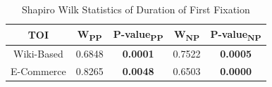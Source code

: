 \begin{table} [H]
    \centering
    \small
    \caption{Shapiro Wilk Statistics of Duration of First Fixation}
    \label{tab:dfff_W_stats}
    \begin{tabular}{|c|c|c|c|c|}
        \hline
        \textbf{TOI} & \textbf{W\textsubscript{PP}} & \textbf{P-value\textsubscript{PP}} & \textbf{W\textsubscript{NP}} & \textbf{P-value\textsubscript{NP}} \\ \hline
        Wiki-Based & 0.6848 & \textbf{\color{red}0.0001} & 0.7522 & \textbf{\color{red}0.0005} \\ \hline
        E-Commerce & 0.8265 & \textbf{\color{red}0.0048} & 0.6503 & \textbf{\color{red}0.0000} \\ \hline
    \end{tabular}
\end{table}

\begin{table}[H]
    \centering
    \small
    \setlength{\tabcolsep}{4pt}
    \caption{Statistics of Duration of First Fixation}
    \label{tab:dfff_stats}
\end{table}

